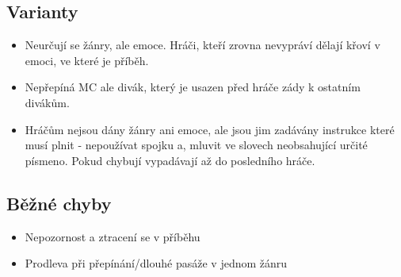 \subsection{ Varianty } \begin{itemize}
\item  Neurčují se žánry, ale emoce. Hráči, kteří zrovna nevypráví dělají křoví v emoci, ve které je příběh.
\item  Nepřepíná MC ale divák, který je usazen před hráče zády k ostatním divákům.
\item  Hráčům nejsou dány žánry ani emoce, ale jsou jim zadávány instrukce které musí plnit - nepoužívat spojku a, mluvit ve slovech neobsahující určité písmeno. Pokud chybují vypadávají až do posledního hráče.
\end{itemize}
 
\subsection{ Běžné chyby } \begin{itemize}
\item  Nepozornost a ztracení se v příběhu
\item  Prodleva při přepínání/dlouhé pasáže v jednom žánru
\end{itemize}
 
 
 
 
 
 
